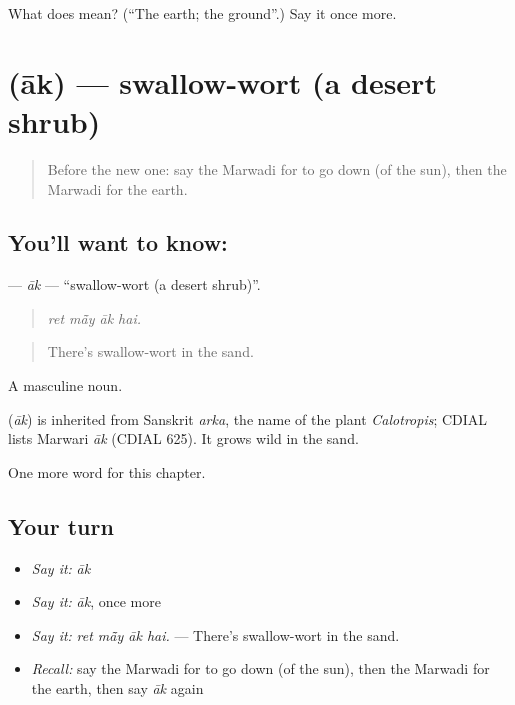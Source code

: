 \begin{tcolorbox}[breakable,colback=teal!4,colframe=teal!35!black,title={Before you move on}]
What does  mean? (\textquotedblleft{}The earth; the ground\textquotedblright{}.) Say it once more.
\end{tcolorbox}
\section[\texorpdfstring{\mw{आक} (āk)}{आक (āk)}]{ (āk) — swallow-wort (a desert shrub)}

\label{lesson:MW-C230-ak}



\begin{quote}
Before the new one: say the Marwadi for to go down (of the sun), then the Marwadi for the earth.
\end{quote}

\subsection*{You'll want to know: }
\textbf{} — \emph{āk} — \textquotedblleft{}swallow-wort (a desert shrub)\textquotedblright{}.

\begin{quote}
   
\end{quote}

\begin{quote}
\emph{ret mā̃y āk hai.}
\end{quote}

\begin{quote}
There's swallow-wort in the sand.
\end{quote}

A masculine noun.

\begin{cousinweb}
\textbf{} (\emph{āk}) is inherited from Sanskrit \emph{arka}, the name of the plant \emph{Calotropis}; CDIAL lists Marwari \emph{āk} (CDIAL 625). It grows wild in the sand.
\end{cousinweb}

\begin{grammarlens}[title={What you've built}]
One more word for this chapter.
\end{grammarlens}

\subsection*{Your turn}
\begin{itemize}
\raggedright
  \item \emph{Say it:} \emph{āk}
  \item \emph{Say it:} \emph{āk}, once more
  \item \emph{Say it:} \emph{ret mā̃y āk hai.} — There's swallow-wort in the sand.
  \item \emph{Recall:} say the Marwadi for to go down (of the sun), then the Marwadi for the earth, then say \emph{āk} again
\end{itemize}

